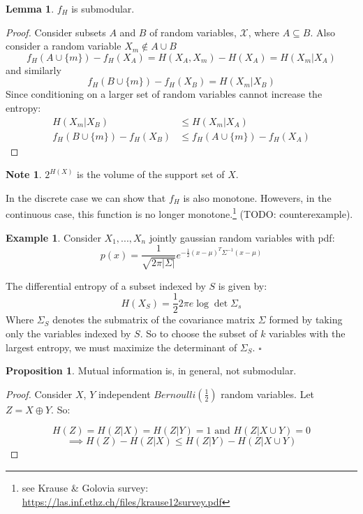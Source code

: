 \documentclass[twoside]{article}
\newcommand*{\QEDB}{\hfill\ensuremath{\square}}%
\newcommand*\xor{\mathbin{\oplus}}
\theoremstyle{definition}
\newtheorem{example}{Example}
\newtheorem{lemma}[theorem]{Lemma}
\newtheorem{proposition}[theorem]{Proposition}
\newtheorem{note}{Note}
\begin{document}
\begin{lemma}
$f_H$ is submodular.
\end{lemma}

\begin{proof}
  Consider subsets $A$ and $B$ of random variables,
  $\mathcal{X}$, where $A \subseteq B$. Also consider a random
  variable $X_m \notin A \cup B$
  $$f_H(A \cup \{m\}) - f_H(X_A) = H(X_A, X_m) - H(X_A) = H(X_m | X_A)$$
  \centering and similarly
  $$f_H(B \cup \{m\}) - f_H(X_B) = H(X_m | X_B)$$
  Since conditioning on a larger set of random variables cannot
  increase the entropy:
  \begin{align*}
    H(X_m | X_B) & \leq H(X_m | X_A) \\
    f_H(B \cup \{m\}) - f_H(X_B) & \leq f_H(A \cup \{m\}) - f_H(X_A)
  \end{align*}
\end{proof}

\begin{note}
  $2^{H(X)}$ is the volume of the support set of $X$.
\end{note}

In the discrete case we can show that $f_H$ is also monotone. Howevers,
in the continuous case, this function is no longer
monotone.\footnote{see Krause \& Golovia survey:
  \href{https://las.inf.ethz.ch/files/krause12survey.pdf}{https://las.inf.ethz.ch/files/krause12survey.pdf}}
(TODO: counterexample).

\begin{example}
  Consider $X_1, ..., X_n$ jointly gaussian random variables with pdf:
  $$p(x) = \frac{1}{\sqrt{2\pi |\Sigma|}} e^{-\frac{1}{2}(x-\mu)^T
    \Sigma^{-1} (x-\mu)}$$

  The differential entropy of a subset indexed by $S$ is given by:
  $$H(X_S) = \frac{1}{2} 2 \pi e\log \det \Sigma_s$$
  Where $\Sigma_S$ denotes the submatrix of the covariance matrix
  $\Sigma$ formed by taking only the variables indexed by $S$. So to
  choose the subset of $k$ variables with the largest entropy, we must
  maximize the determinant of $\Sigma_S$.
  \QEDB
\end{example}

\begin{proposition}
  Mutual information is, in general, not submodular.
\end{proposition}
\begin{proof}
  Consider $X$, $Y$
  independent $Bernoulli(\frac{1}{2})$ random variables. Let $Z = X
  \xor Y$. So:

  $$H(Z) = H (Z | X) = H (Z | Y) = 1  \text{ and } H (Z | X \cup Y) = 0$$
  $$\implies H(Z) - H(Z | X) \leq H (Z | Y) - H (Z | X \cup Y)$$
\end{proof}
\end{document}
